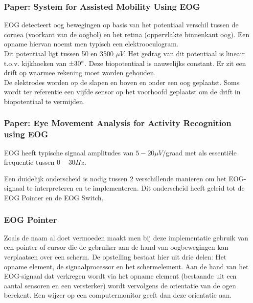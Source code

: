 \documentclass[12pt,a4paper]{article}
\begin{document}
		\subsubsection{Paper: System for Assisted Mobility Using EOG}
			EOG detecteert oog bewegingen op basis van het potentiaal verschil tussen de cornea (voorkant van de oogbol) en het retina (oppervlakte binnenkant oog). Een opname hiervan noemt men typisch een elektrooculogram.\\
			
			Dit potentiaal ligt tussen 50 en 3500 $\mu V$. Het gedrag van dit potentiaal is lineair t.o.v. kijkhoeken van $\pm30\degree$. Deze biopotentiaal is nauwelijks constant. Er zit een drift op waarmee rekening moet worden gehouden.\\
			
			De elektrodes worden op de slapen en boven en onder een oog geplaatst. Soms wordt ter referentie een vijfde sensor op het voorhoofd geplaatst om de drift in biopotentiaal te vermijden.
			
		\subsubsection{Paper: Eye Movement Analysis for Activity Recognition using EOG}
			EOG heeft typische signaal amplitudes van $5 - 20 \mu V$/graad met als essentiële frequentie tussen $0 - 30Hz$.
			
		Een duidelijk onderscheid is nodig tussen 2 verschillende manieren om het EOG-signaal te interpreteren en te implementeren. Dit onderscheid heeft geleid tot de EOG Pointer en de EOG Switch.
		\subsubsection{EOG Pointer}
		Zoals de naam al doet vermoeden maakt men bij deze implementatie gebruik van een pointer of cursor die de gebruiker aan de hand van oogbewegingen kan verplaatsen over een scherm. De opstelling bestaat hier uit drie delen: Het opname element, de signaalprocessor en het schermelement. Aan de hand van het EOG-signaal dat verkregen wordt via het opname element (bestaande uit een aantal sensoren en een versterker) wordt vervolgens de orientatie van de ogen berekent. Een wijzer op een computermonitor geeft dan deze orientatie aan.
\end{document}
